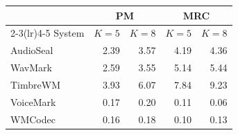 \begin{tabular}{lrrrr}
\toprule
& \multicolumn{2}{c}{PM} & \multicolumn{2}{c}{MRC} \\
\cmidrule(lr){2-3}\cmidrule(lr){4-5}
System & $K=5$ & $K=8$ & $K=5$ & $K=8$ \\
\midrule
AudioSeal & 2.39 & 3.57 & 4.19 & 4.36 \\
WavMark   & 2.59 & 3.55 & 5.14 & 5.44 \\
TimbreWM  & 3.93 & 6.07 & 7.84 & 9.23 \\
VoiceMark & 0.17 & 0.20 & 0.11 & 0.06 \\
WMCodec   & 0.16 & 0.18 & 0.10 & 0.13 \\
\bottomrule
\end{tabular}
